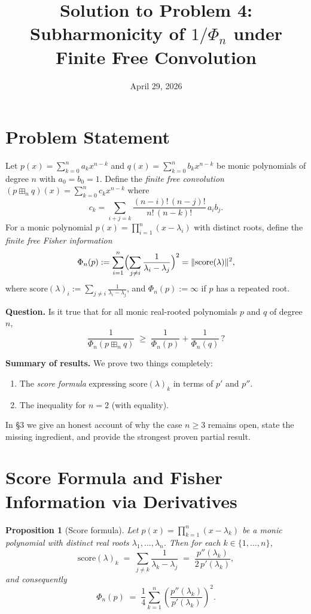 \documentclass[12pt]{article}
\title{Solution to Problem 4:\\
Subharmonicity of $1/\Phi_n$ under Finite Free Convolution}
\author{}
\date{April 29, 2026}
\newtheorem{proposition}[theorem]{Proposition}
\theoremstyle{definition}
\newcommand{\score}{\mathrm{score}}
\begin{document}
\maketitle

\section*{Problem Statement}

Let $p(x) = \sum_{k=0}^n a_k x^{n-k}$ and $q(x) = \sum_{k=0}^n b_k x^{n-k}$ be monic polynomials of degree $n$ with $a_0 = b_0 = 1$. Define the \emph{finite free convolution} $(p \boxplus_n q)(x) = \sum_{k=0}^n c_k x^{n-k}$ where
\[
  c_k = \sum_{i+j=k} \frac{(n-i)!\,(n-j)!}{n!\,(n-k)!}\,a_i b_j.
\]
For a monic polynomial $p(x) = \prod_{i=1}^n (x - \lambda_i)$ with distinct roots, define the \emph{finite free Fisher information}
\[
  \Phi_n(p) := \sum_{i=1}^n \Bigl(\sum_{j \neq i} \frac{1}{\lambda_i - \lambda_j}\Bigr)^2 = \|\score(\lambda)\|^2,
\]
where $\score(\lambda)_i := \sum_{j \neq i} \tfrac{1}{\lambda_i - \lambda_j}$, and $\Phi_n(p) := \infty$ if $p$ has a repeated root.

\medskip
\noindent\textbf{Question.} Is it true that for all monic real-rooted polynomials $p$ and $q$ of degree $n$,
\[
  \frac{1}{\Phi_n(p \boxplus_n q)} \;\ge\; \frac{1}{\Phi_n(p)} + \frac{1}{\Phi_n(q)}\,?
\]

\medskip
\noindent\textbf{Summary of results.} We prove two things completely:
\begin{enumerate}
  \item[\S1.] The \emph{score formula} expressing $\score(\lambda)_k$ in terms of $p'$ and $p''$.
  \item[\S2.] The inequality for $n = 2$ (with equality).
\end{enumerate}
In \S3 we give an honest account of why the case $n \ge 3$ remains open, state the missing ingredient, and provide the strongest proven partial result.

\section{Score Formula and Fisher Information via Derivatives}

\begin{proposition}[Score formula]\label{prop:score}
Let $p(x) = \prod_{k=1}^n (x - \lambda_k)$ be a monic polynomial with distinct real roots $\lambda_1, \dots, \lambda_n$. Then for each $k \in \{1,\dots,n\}$,
\begin{equation}\label{eq:score}
  \score(\lambda)_k \;=\; \sum_{j \neq k} \frac{1}{\lambda_k - \lambda_j}
  \;=\; \frac{p''(\lambda_k)}{2\,p'(\lambda_k)},
\end{equation}
and consequently
\begin{equation}\label{eq:Phi_deriv}
  \Phi_n(p) \;=\; \frac{1}{4} \sum_{k=1}^n \left(\frac{p''(\lambda_k)}{p'(\lambda_k)}\right)^2.
\end{equation}
\end{proposition}
\end{document}
